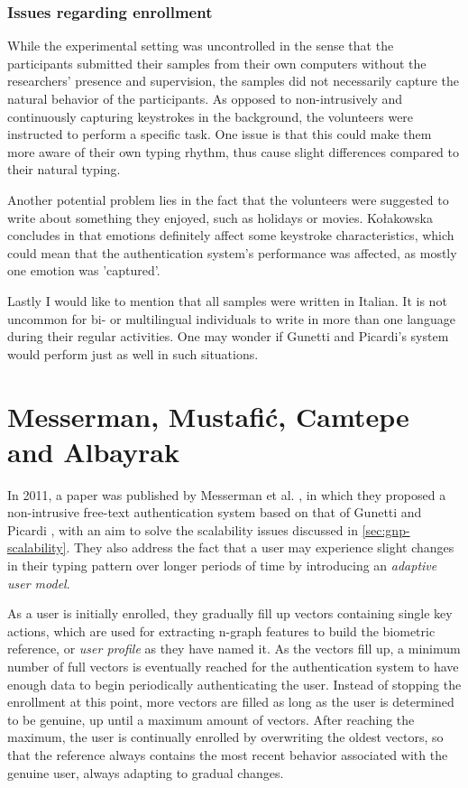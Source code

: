 \documentclass[informationsecurity]{gucmasterproject}
\begin{document}
\subsection{Issues regarding enrollment}
While the experimental setting was uncontrolled in the sense that the participants submitted their samples from their own computers without the researchers' presence and supervision, the samples did not necessarily capture the natural behavior of the participants.
As opposed to non-intrusively and continuously capturing keystrokes in the background, the volunteers were instructed to perform a specific task.
One issue is that this could make them more aware of their own typing rhythm, thus cause slight differences compared to their natural typing.

Another potential problem lies in the fact that the volunteers were suggested to write about something they enjoyed, such as holidays or movies.
Kołakowska concludes in \cite{emotion} that emotions definitely affect some keystroke characteristics, which could mean that the authentication system's performance was affected, as mostly one emotion was 'captured'.

Lastly I would like to mention that all samples were written in Italian.
It is not uncommon for bi- or multilingual individuals to write in more than one language during their regular activities.
One may wonder if Gunetti and Picardi's system would perform just as well in such situations.

\chapter{Messerman, Mustafić, Camtepe and Albayrak}
\label{chap:messerman}
In 2011, a paper was published by Messerman et al. \cite{Messerman}, in which they proposed a non-intrusive free-text authentication system based on that of Gunetti and Picardi \cite{gnp}, with an aim to solve the scalability issues discussed in \autoref{sec:gnp-scalability}.
They also address the fact that a user may experience slight changes in their typing pattern over longer periods of time by introducing an \textit{adaptive user model}.

As a user is initially enrolled, they gradually fill up vectors containing single key actions, which are used for extracting n-graph features to build the biometric reference, or \textit{user profile} as they have named it.
As the vectors fill up, a minimum number of full vectors is eventually reached for the authentication system to have enough data to begin periodically authenticating the user.
Instead of stopping the enrollment at this point, more vectors are filled as long as the user is determined to be genuine, up until a maximum amount of vectors.
After reaching the maximum, the user is continually enrolled by overwriting the oldest vectors, so that the reference always contains the most recent behavior associated with the genuine user, always adapting to gradual changes.
\end{document}
